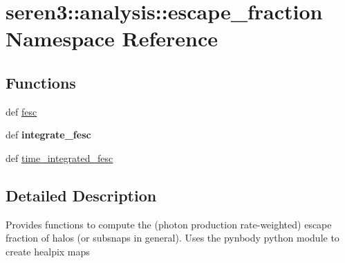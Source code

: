 \hypertarget{namespaceseren3_1_1analysis_1_1escape__fraction}{
\section{seren3::analysis::escape\_\-fraction Namespace Reference}
\label{namespaceseren3_1_1analysis_1_1escape__fraction}
}
\subsection*{Functions}
\begin{DoxyCompactItemize}
\item 
def \hyperlink{namespaceseren3_1_1analysis_1_1escape__fraction_a507b1414c2915fb5cafcc02ae4762f05}{fesc}
\item 
\hypertarget{namespaceseren3_1_1analysis_1_1escape__fraction_ae71d18f88926f11ddde84c1c048e9180}{
def {\bfseries integrate\_\-fesc}}
\label{namespaceseren3_1_1analysis_1_1escape__fraction_ae71d18f88926f11ddde84c1c048e9180}

\item 
def \hyperlink{namespaceseren3_1_1analysis_1_1escape__fraction_ae28fa7f0028e3796234f82f24ba4f2e5}{time\_\-integrated\_\-fesc}
\end{DoxyCompactItemize}


\subsection{Detailed Description}
\begin{DoxyVerb}
Provides functions to compute the (photon production rate-weighted) escape fraction
of halos (or subsnaps in general).
Uses the pynbody python module to create healpix maps
\end{DoxyVerb}
 

